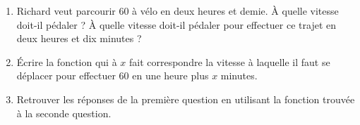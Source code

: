 
\begin{exercice}\label{exosmath-0262}

    \begin{enumerate}
        \item
    Richard veut parcourir \unit{60}{\kilo\meter} à vélo en deux heures et demie. À quelle vitesse doit-il pédaler ? À quelle vitesse doit-il pédaler pour effectuer ce trajet en deux heures et dix minutes ?

\item
    Écrire la fonction qui à \( x\) fait correspondre la vitesse à laquelle il faut se déplacer pour effectuer \unit{60}{\kilo\meter} en une heure plus \( x\) minutes.
\item
    Retrouver les réponses de la première question en utilisant la fonction trouvée à la seconde question.            
    \end{enumerate}

\end{exercice}
